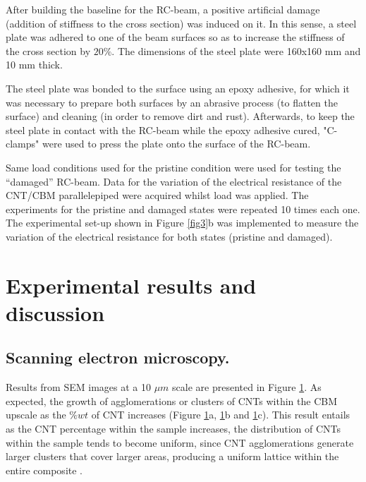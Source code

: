 \documentclass[twocolumn]{bmcart}%
\begin{document}
After building the baseline for the RC-beam, a positive artificial damage (addition of stiffness to the cross section) was induced on it. In this sense, a steel plate was adhered to one of the beam surfaces so as to increase the stiffness of the cross section by $20\%$. The dimensions of the steel plate were 160x160 mm and 10 mm thick. 

The steel plate was bonded to the surface using an epoxy adhesive, for which it was necessary to prepare both surfaces by an abrasive process (to flatten the surface) and cleaning (in order to remove dirt and rust). Afterwards, to keep the steel plate in contact with the RC-beam while the epoxy adhesive cured, "C-clamps" were used to press the plate onto the surface of the RC-beam.

Same load conditions used for the pristine condition were used for testing the “damaged” RC-beam. Data for the variation of the electrical resistance of the CNT/CBM parallelepiped were acquired whilst load was applied. The experiments for the pristine and damaged states were repeated 10 times each one. The experimental set-up shown in Figure \ref{fig3}b was implemented to measure the variation of the electrical resistance for both states (pristine and damaged).

\section{Experimental results and discussion}

\subsection{Scanning electron microscopy.}

Results from SEM images at a 10 $\mu m$ scale are presented in Figure \ref{fig7}. As expected, the growth of agglomerations or clusters of CNTs within the CBM upscale as the $\%wt$ of CNT increases (Figure \ref{fig7}a, \ref{fig7}b and \ref{fig7}c). This result entails as the CNT percentage within the sample increases, the distribution of CNTs within the sample tends to become uniform, since CNT agglomerations generate larger clusters that cover larger areas, producing a uniform lattice within the entire composite \cite{Garcia-Macias2017, Nam2015}.

\begin{figure}[h!]
  \caption{
      }
      \label{fig7}
      \end{figure}
\end{document}
